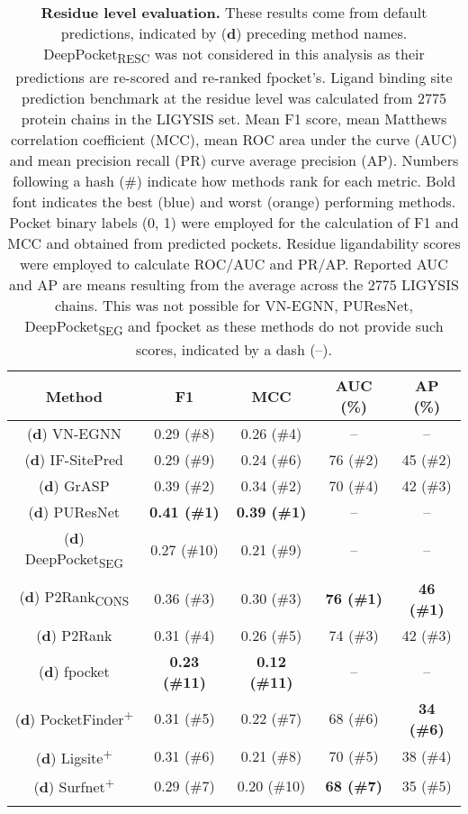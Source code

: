\begin{longtable}[c]{|c|c|c|c|c|}
\hline
\textbf{Method}         & \textbf{F1}   & \textbf{MCC}  & \textbf{AUC} (\%)  & \textbf{AP} (\%)   \\ \hline
\endfirsthead
%
\footnotesize{(\textbf{d})} VN-EGNN        & 0.29 (\#8) & 0.26 (\#4) & --    & --    \\ \hline
\footnotesize{(\textbf{d})} IF-SitePred    & 0.29 (\#9) & 0.24 (\#6) & 76 (\#2)  & 45 (\#2) \\ \hline
\footnotesize{(\textbf{d})} GrASP          & 0.39 (\#2) & 0.34 (\#2) & 70 (\#4) & 42 (\#3) \\ \hline
\footnotesize{(\textbf{d})} PUResNet       & \textbf{\textcolor{CBBlue}{0.41 (\#1)}} & \textbf{\textcolor{CBBlue}{0.39 (\#1)}} & --    & --    \\ \hline
\footnotesize{(\textbf{d})} DeepPocket\textsubscript{SEG}  & 0.27 (\#10) & 0.21 (\#9) & --    & --    \\ \hline
\footnotesize{(\textbf{d})} P2Rank\textsubscript{CONS}     & 0.36 (\#3) & 0.30 (\#3)  & \textbf{\textcolor{CBBlue}{76 (\#1)}} & \textbf{\textcolor{CBBlue}{46 (\#1)}} \\ \hline
\footnotesize{(\textbf{d})} P2Rank         & 0.31 (\#4) & 0.26 (\#5) & 74 (\#3) & 42 (\#3) \\ \hline
\footnotesize{(\textbf{d})} fpocket        & \textbf{\textcolor{CBOrange}{0.23 (\#11)}} & \textbf{\textcolor{CBOrange}{0.12 (\#11)}} & --    & --    \\ \hline
\footnotesize{(\textbf{d})} PocketFinder\textsuperscript{+}  & 0.31 (\#5) & 0.22 (\#7) & 68 (\#6) & \textbf{\textcolor{CBOrange}{34 (\#6)}} \\ \hline
\footnotesize{(\textbf{d})} Ligsite\textsuperscript{+}       & 0.31 (\#6) & 0.21 (\#8) & 70 (\#5) & 38 (\#4) \\ \hline
\footnotesize{(\textbf{d})} Surfnet\textsuperscript{+}       & 0.29 (\#7) & 0.20 (\#10)  & \textbf{\textcolor{CBOrange}{68 (\#7)}} & 35 (\#5) \\ \hline
\caption[Residue level evaluation]{\textbf{Residue level evaluation.} These results come from default predictions, indicated by (\textbf{d}) preceding method names. DeepPocket\textsubscript{RESC} was not considered in this analysis as their predictions are re-scored and re-ranked fpocket's. Ligand binding site prediction benchmark at the residue level was calculated from 2775 protein chains in the LIGYSIS set. Mean F1 score, mean Matthews correlation coefficient (MCC), mean ROC area under the curve (AUC) and mean precision recall (PR) curve average precision (AP). Numbers following a hash (\#) indicate how methods rank for each metric. Bold font indicates the best (blue) and worst (orange) performing methods. Pocket binary labels (0, 1) were employed for the calculation of F1 and MCC and obtained from predicted pockets. Residue ligandability scores were employed to calculate ROC/AUC and PR/AP. Reported AUC and AP are means resulting from the average across the 2775 LIGYSIS chains. This was not possible for VN-EGNN, PUResNet, DeepPocket\textsubscript{SEG} and fpocket as these methods do not provide such scores, indicated by a dash (--).}

\end{longtable}
